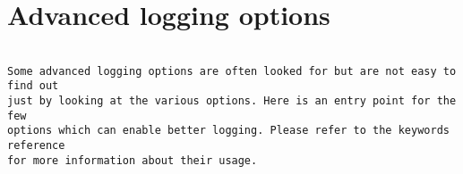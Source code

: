 
\section{Advanced logging options}

\begin{verbatim}

Some advanced logging options are often looked for but are not easy to find out
just by looking at the various options. Here is an entry point for the few
options which can enable better logging. Please refer to the keywords reference
for more information about their usage.


\end{verbatim}
